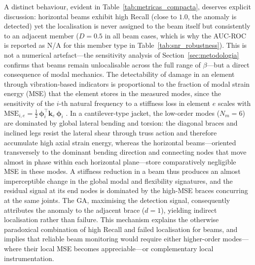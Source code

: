 \documentclass[a4paper,fleqn,nologo]{cas-dc}
\begin{document}
A distinct behaviour, evident in Table~\ref{tab:metricas_compacta}, deserves explicit
discussion: horizontal beams exhibit high Recall (close to $1.0$, the anomaly is detected)
yet the localisation is never assigned to the beam itself but consistently to an adjacent
member ($D=0.5$ in all beam cases, which is why the AUC-ROC is reported as N/A for this
member type in Table~\ref{tab:snr_robustness}). This is not a numerical artefact---the
sensitivity analysis of Section~\ref{sec:metodologia} confirms that beams remain
unlocalisable across the full range of $\beta$---but a direct consequence of modal
mechanics. The detectability of damage in an element through vibration-based indicators is
proportional to the fraction of modal strain energy (MSE) that the element stores in the
measured modes, since the sensitivity of the $i$-th natural frequency to a stiffness loss
in element $e$ scales with $\text{MSE}_{i,e}=\tfrac{1}{2}\,\boldsymbol{\phi}_i^{\!\top}\mathbf{k}_e\,\boldsymbol{\phi}_i$
\citep{doebling1996damage}. In a cantilever-type jacket, the low-order modes ($N_m=6$) are
dominated by global lateral bending and torsion: the diagonal braces and inclined legs
resist the lateral shear through truss action and therefore accumulate high axial strain
energy, whereas the horizontal beams---oriented transversely to the dominant bending
direction and connecting nodes that move almost in phase within each horizontal plane---store
comparatively negligible MSE in these modes. A stiffness reduction in a beam thus produces an
almost imperceptible change in the global modal and flexibility signatures, and the residual
signal at its end nodes is dominated by the high-MSE braces concurring at the same joints. The
GA, maximising the detection signal, consequently attributes the anomaly to the adjacent brace
($d=1$), yielding indirect localisation rather than failure. This mechanism explains the
otherwise paradoxical combination of high Recall and failed localisation for beams, and
implies that reliable beam monitoring would require either higher-order modes---where their
local MSE becomes appreciable---or complementary local instrumentation.
\end{document}
